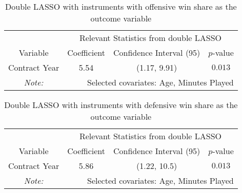 \documentclass[12pt]{article}
\begin{document}
	\begin{table}[!htbp]
		\centering
		\caption{Double LASSO with instruments with offensive win share as the outcome variable}
		\label{lassoivows} 
		\begin{tabular}{*4c}
			\toprule
			& \multicolumn{3}{c}{Relevant Statistics from double LASSO} \\
			\cmidrule(lr){2-4}
			Variable & Coefficient  & Confidence Interval (95) & $p$-value \\
			\midrule
			Contract Year & 5.54       & (1.17, 9.91) & $0.013$       \\
			\bottomrule
			\textit{Note:}  & \multicolumn{3}{r}{Selected covariates: Age, Minutes Played} \\
		\end{tabular}
	\end{table}
	
	\begin{table}[!htbp]
		\centering
		\caption{Double LASSO with instruments with defensive win share as the outcome variable}
		\label{lassoivdws} 
		\begin{tabular}{*4c}
			\toprule
			& \multicolumn{3}{c}{Relevant Statistics from double LASSO} \\
			\cmidrule(lr){2-4}
			Variable & Coefficient  & Confidence Interval (95) & $p$-value \\
			\midrule
			Contract Year & 5.86       & (1.22, 10.5) & $0.013$       \\
			\bottomrule
			\textit{Note:}  & \multicolumn{3}{r}{Selected covariates: Age, Minutes Played} \\
		\end{tabular}
	\end{table}
\end{document}

